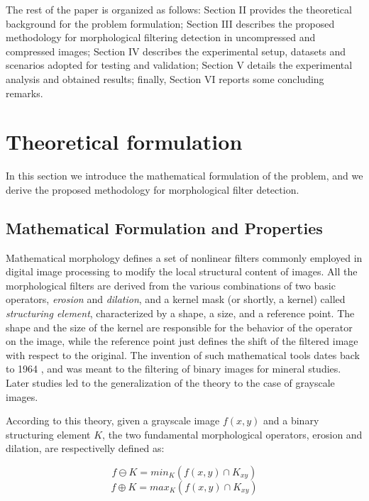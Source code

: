 \documentclass[review]{elsarticle}
\begin{document}
The rest of the paper is organized as follows: Section II provides the theoretical background for the problem formulation; Section III describes the proposed methodology for morphological filtering detection in uncompressed and compressed images; Section IV describes the experimental setup, datasets and scenarios adopted for testing and validation; Section V details the experimental analysis and  obtained results; finally, Section VI reports some concluding remarks.   

\section{Theoretical formulation}
\label{sec:method}
In this section we introduce the mathematical formulation of the problem, and we derive the proposed methodology for morphological filter detection. 

\subsection{Mathematical Formulation and Properties}
Mathematical morphology defines a set of nonlinear filters commonly employed in digital image processing to modify the local structural content of images. All the morphological filters are derived from the various combinations of two basic operators, \textit{erosion} and \textit{dilation}, and a kernel mask (or shortly, a kernel) called \textit{structuring element}, characterized by a shape, a size, and a reference point. The shape and the size of the kernel are responsible for the behavior of the operator on the image, while the reference point just defines the shift of the filtered image with respect to the original. The invention of such mathematical tools dates back to 1964 \cite{haas1967morphologie}, and was meant to the filtering of binary images for mineral studies. Later studies \cite{nakagawa1977note} led to the generalization of the theory to the case of grayscale images.

According to this theory, given a grayscale image $f(x,y)$ and a binary structuring element $K$, the two fundamental morphological operators, erosion and dilation, are respectivelly defined as:

\begin{equation} \label{eq:erode}
f \ominus K = min_K(f(x,y) \cap K_{xy})
\end{equation}
\begin{equation} \label{eq:dilate}
f \oplus K = max_K(f(x,y) \cap K_{xy})
\end{equation}
\end{document}
